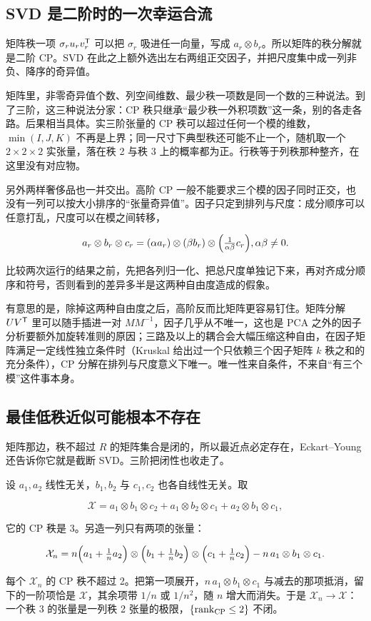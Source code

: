 \subsection{SVD 是二阶时的一次幸运合流}

矩阵秩一项 \(\sigma_ru_rv_r^{\trans}\) 可以把 \(\sigma_r\) 吸进任一向量，写成 \(a_r\otimes b_r\)。所以矩阵的秩分解就是二阶 CP。SVD 在此之上额外选出左右两组正交因子，并把尺度集中成一列非负、降序的奇异值。

矩阵里，非零奇异值个数、列空间维数、最少秩一项数是同一个数的三种说法。到了三阶，这三种说法分家：CP 秩只继承``最少秩一外积项数''这一条，别的各走各路。后果相当具体。实三阶张量的 CP 秩可以超过任何一个模的维数，\(\min(I,J,K)\) 不再是上界；同一尺寸下典型秩还可能不止一个，随机取一个 \(2\times2\times2\) 实张量，落在秩 2 与秩 3 上的概率都为正。行秩等于列秩那种整齐，在这里没有对应物。

另外两样奢侈品也一并交出。高阶 CP 一般不能要求三个模的因子同时正交，也没有一列可以按大小排序的``张量奇异值''。因子只定到排列与尺度：成分顺序可以任意打乱，尺度可以在模之间转移，

\[
a_r\otimes b_r\otimes c_r=(\alpha a_r)\otimes(\beta b_r)\otimes\Bigl(\tfrac{1}{\alpha\beta}c_r\Bigr),
\qquad \alpha\beta\neq0 .
\]

比较两次运行的结果之前，先把各列归一化、把总尺度单独记下来，再对齐成分顺序和符号，否则看到的差异多半是这两种自由度造成的假象。

有意思的是，除掉这两种自由度之后，高阶反而比矩阵更容易钉住。矩阵分解 \(UV^{\trans}\) 里可以随手插进一对 \(MM^{-1}\)，因子几乎从不唯一，这也是 PCA 之外的因子分析要额外加旋转准则的原因；三路及以上的耦合会大幅压缩这种自由，在因子矩阵满足一定线性独立条件时（Kruskal 给出过一个只依赖三个因子矩阵 \(k\) 秩之和的充分条件），CP 分解在排列与尺度意义下唯一。唯一性来自条件，不来自``有三个模''这件事本身。

\subsection{最佳低秩近似可能根本不存在}

矩阵那边，秩不超过 \(R\) 的矩阵集合是闭的，所以最近点必定存在，Eckart--Young 还告诉你它就是截断 SVD。三阶把闭性也收走了。

\begin{example}
设 \(a_1,a_2\) 线性无关，\(b_1,b_2\) 与 \(c_1,c_2\) 也各自线性无关。取

\[
\mathcal X=a_1\otimes b_1\otimes c_2+a_1\otimes b_2\otimes c_1+a_2\otimes b_1\otimes c_1 ,
\]

它的 CP 秩是 3。另造一列只有两项的张量：

\[
\mathcal X_n=n\Bigl(a_1+\tfrac1n a_2\Bigr)\otimes\Bigl(b_1+\tfrac1n b_2\Bigr)\otimes\Bigl(c_1+\tfrac1n c_2\Bigr)-n\,a_1\otimes b_1\otimes c_1 .
\]

每个 \(\mathcal X_n\) 的 CP 秩不超过 2。把第一项展开，\(n\,a_1\otimes b_1\otimes c_1\) 与减去的那项抵消，留下的一阶项恰是 \(\mathcal X\)，其余项带 \(1/n\) 或 \(1/n^2\)，随 \(n\) 增大而消失。于是 \(\mathcal X_n\to\mathcal X\)：一个秩 3 的张量是一列秩 2 张量的极限，\(\{\rank_{\mathrm{CP}}\le2\}\) 不闭。
\end{example}


